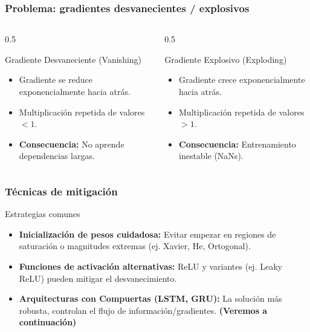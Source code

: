 \documentclass[handout]{beamer}
\begin{document}
\begin{frame}
    \frametitle{Problema: gradientes desvanecientes / explosivos}
    \begin{columns}[T] %
        \begin{column}{0.5\textwidth}
            \begin{alertblock}{Gradiente Desvaneciente (Vanishing)}
                \begin{itemize}
                    \item<+-> Gradiente se reduce exponencialmente hacia atrás.
                    \item<+-> Multiplicación repetida de valores $< 1$.
                    \item<+-> \textbf{Consecuencia:} No aprende dependencias largas.
                \end{itemize}
                 
            \end{alertblock}
        \end{column}
        \begin{column}{0.5\textwidth}
            \begin{alertblock}{Gradiente Explosivo (Exploding)}
                \begin{itemize}
                    \item<+-> Gradiente crece exponencialmente hacia atrás.
                    \item<+-> Multiplicación repetida de valores $> 1$.
                    \item<+-> \textbf{Consecuencia:} Entrenamiento inestable (NaNs).
                \end{itemize}
                 
            \end{alertblock}
        \end{column}
    \end{columns}
    \begin{center}  %
    \end{center}
\end{frame}

\begin{frame}
    \frametitle{Técnicas de mitigación}
    \begin{block}{Estrategias comunes}
        \begin{itemize}
            \item \textbf{Inicialización de pesos cuidadosa:} Evitar empezar en regiones de saturación o magnitudes extremas (ej. Xavier, He, Ortogonal).
            \item \textbf{Funciones de activación alternativas:} ReLU y variantes (ej. Leaky ReLU) pueden mitigar el desvanecimiento.
            \item \textbf{Arquitecturas con Compuertas (LSTM, GRU):} La solución más robusta, controlan el flujo de información/gradientes. \textbf{(Veremos a continuación)}
        \end{itemize}
    \end{block}
\end{frame}
\end{document}
